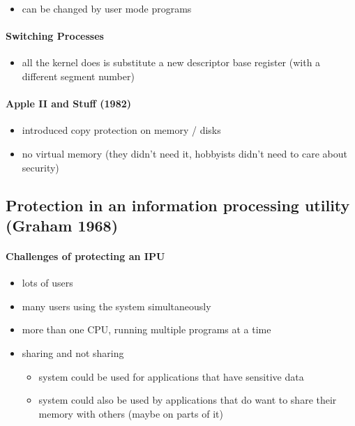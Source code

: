 \documentclass[
  12pt]{findlay}
\providecommand{\tightlist}{%
  \setlength{\itemsep}{0pt}\setlength{\parskip}{0pt}}
\begin{document}
\begin{itemize}
\tightlist
\item
  can be changed by user mode programs
\end{itemize}

\hypertarget{switching-processes}{%
\paragraph{Switching Processes}\label{switching-processes}}

\begin{itemize}
\tightlist
\item
  all the kernel does is substitute a new descriptor base register (with
  a different segment number)
\end{itemize}

\hypertarget{apple-ii-and-stuff-1982}{%
\paragraph{Apple II and Stuff (1982)}\label{apple-ii-and-stuff-1982}}

\begin{itemize}
\tightlist
\item
  introduced copy protection on memory / disks
\item
  no virtual memory (they didn't need it, hobbyists didn't need to care
  about security)
\end{itemize}

\hypertarget{protection-in-an-information-processing-utility-graham-1968}{%
\subsection{Protection in an information processing utility (Graham
1968)}\label{protection-in-an-information-processing-utility-graham-1968}}

\hypertarget{challenges-of-protecting-an-ipu}{%
\paragraph{Challenges of protecting an
IPU}\label{challenges-of-protecting-an-ipu}}

\begin{itemize}
\tightlist
\item
  lots of users
\item
  many users using the system simultaneously
\item
  more than one CPU, running multiple programs at a time
\item
  sharing and not sharing

  \begin{itemize}
  \tightlist
  \item
    system could be used for applications that have sensitive data
  \item
    system could also be used by applications that do want to share
    their memory with others (maybe on parts of it)
  \end{itemize}
\end{itemize}
\end{document}
